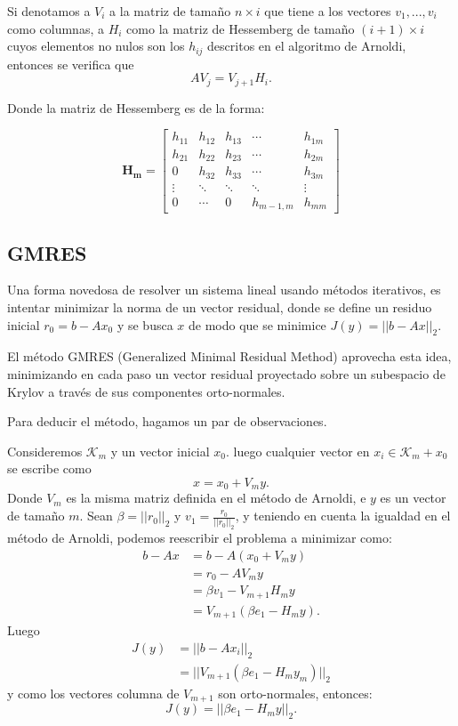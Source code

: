 \documentclass[12pt, oneside]{book}
\begin{document}
	Si denotamos a $V_i$ a la matriz de tamaño $n\times i$ que tiene a los vectores $v_1, ..., v_i$ como columnas, a $H_i$ como la matriz de Hessemberg de tamaño $(i+1)\times i$ cuyos elementos no nulos son los $h_{ij}$ descritos en el algoritmo de Arnoldi, entonces se verifica que $$AV_j=V_{j+1}H_i.$$
	
	Donde la matriz de Hessemberg es de la forma: 
	
	$$
	\mathbf{H_m} =
	\begin{bmatrix}
		h_{11} & h_{12} & h_{13} & \cdots & h_{1m} \\
		h_{21} & h_{22} & h_{23} & \cdots & h_{2m} \\
		0      & h_{32} & h_{33} & \cdots & h_{3m} \\
		\vdots & \ddots & \ddots & \ddots & \vdots \\
		0      & \cdots & 0      & h_{m-1,m} & h_{mm}
	\end{bmatrix}
	$$
	
	
\subsection{GMRES}
	Una forma novedosa de resolver un sistema lineal usando métodos iterativos, es intentar minimizar la norma de un vector residual, donde se define un residuo inicial $r_0=b-Ax_0$ y se busca $x$ de modo que se minimice $J(y)=||b-Ax||_2$.
	
	El método GMRES (Generalized Minimal Residual Method) aprovecha esta idea, minimizando en cada paso un vector residual proyectado sobre un subespacio de Krylov a través de sus componentes orto-normales. 
	
	Para deducir el método, hagamos un par de observaciones.
	
	Consideremos $\mathcal{K}_m$ y un vector inicial $x_0$. luego cualquier vector en $x_i\in\mathcal{K}_m+x_0$ se escribe como $$x=x_0+V_my.$$
	Donde $V_m$ es la misma matriz definida en el método de Arnoldi, e $y$ es un vector de tamaño $m$. Sean $\beta = ||r_0||_2$ y $v_1=\frac{r_0}{||r_0||_2}$, y teniendo en cuenta la igualdad en el método de Arnoldi, podemos reescribir el problema a minimizar como:
	\begin{equation*}
		\begin{split}
			b-Ax&=b-A(x_0+V_my)\\
			    &= r_0-AV_my\\
			&= \beta v_1-V_{m+1}H_my\\
			&= V_{m+1}(\beta e_1 - H_my).
		\end{split}
	\end{equation*}
	Luego 
	\begin{equation*}
		\begin{split}
			J(y)&=||b-Ax_i||_2\\
			&=||V_{m+1}(\beta e_1 - H_my_m)||_2    
		\end{split}
	\end{equation*}
	y como los vectores columna de $V_{m+1}$ son orto-normales, entonces:
	$$J(y)=||\beta e_1 - H_my||_2.$$
	
\end{document}
